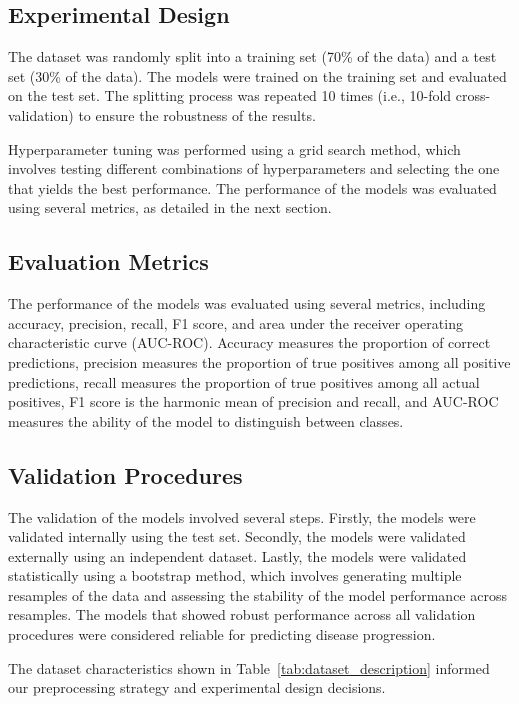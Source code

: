 \documentclass[conference]{IEEEtran}
\begin{document}
\subsection{Experimental Design}
The dataset was randomly split into a training set (70\% of the data) and a test set (30\% of the data). The models were trained on the training set and evaluated on the test set. The splitting process was repeated 10 times (i.e., 10-fold cross-validation) to ensure the robustness of the results.

Hyperparameter tuning was performed using a grid search method, which involves testing different combinations of hyperparameters and selecting the one that yields the best performance. The performance of the models was evaluated using several metrics, as detailed in the next section.

\subsection{Evaluation Metrics}
The performance of the models was evaluated using several metrics, including accuracy, precision, recall, F1 score, and area under the receiver operating characteristic curve (AUC-ROC). Accuracy measures the proportion of correct predictions, precision measures the proportion of true positives among all positive predictions, recall measures the proportion of true positives among all actual positives, F1 score is the harmonic mean of precision and recall, and AUC-ROC measures the ability of the model to distinguish between classes.

\subsection{Validation Procedures}
The validation of the models involved several steps. Firstly, the models were validated internally using the test set. Secondly, the models were validated externally using an independent dataset. Lastly, the models were validated statistically using a bootstrap method, which involves generating multiple resamples of the data and assessing the stability of the model performance across resamples. The models that showed robust performance across all validation procedures were considered reliable for predicting disease progression.

The dataset characteristics shown in Table~\ref{tab:dataset_description} informed our preprocessing strategy and experimental design decisions.
\end{document}
